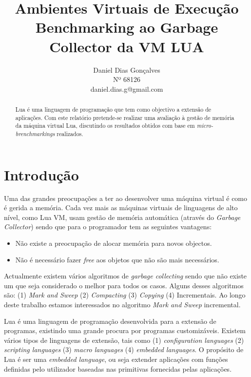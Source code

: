 \documentclass{article}
\begin{document}
\title{Ambientes Virtuais de Execução \\ Benchmarking ao Garbage Collector da VM LUA}
\author{Daniel Dias Gonçalves \\ Nº 68126 \\ daniel.dias.g@gmail.com}
\maketitle

\begin{abstract}
Lua é uma linguagem de programação que tem como objectivo a extensão de aplicações. Com este relatório pretende-se realizar uma avaliação à gestão de memória da máquina virtual Lua, discutindo os resultados obtidos com base em \emph{micro-brenchmarkings} realizados.
\end{abstract}

%
\section{Introdução}
\label{sec:intro}
%
Uma das grandes preocupações a ter ao desenvolver uma máquina virtual é como é gerida a memória. Cada vez mais as máquinas virtuais de linguagens de alto nível, como Lua VM, usam gestão de memória automática (através do \emph{Garbage Collector}) sendo que para o programador tem as seguintes vantagens:
\begin{itemize}
\item Não existe a preocupação de alocar memória para novos objectos.
\item Não é necessário fazer \emph{free} aos objetos que não são mais necessários.
\end{itemize}

Actualmente existem vários algoritmos de \emph{garbage collecting} sendo que não existe um que seja considerado o melhor para todos os casos. Alguns desses algoritmos são: (1) \emph{Mark and Sweep} (2) \emph{Compacting} (3) \emph{Copying} (4) Incrementais. Ao longo deste trabalho estamos interessados no algoritmo \emph{Mark and Sweep} incremental.

Lua é uma linguagem de programação desenvolvida para a extensão de programas, existindo uma grande procura por programas customizáveis.
Existem vários tipos de linguagens de extensão, tais como (1) \emph{configuration languages} (2) \emph{scripting languages} (3) \emph{macro languages} (4) \emph{embedded languages}.
O propósito de Lua é ser uma \emph{embedded language}, ou seja extender aplicações com funções definidas pelo utilizador baseadas nas primitivas fornecidas pelas aplicações.
\end{document}
